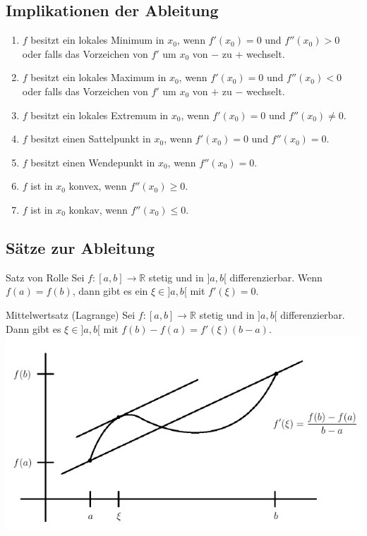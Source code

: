 \documentclass[a4paper,10pt]{article}
\def\R{\mathbb{R}}
\begin{document}
\subsection{Implikationen der Ableitung}
\begin{enumerate}
  \item $f$ besitzt ein lokales Minimum in $x_0$, wenn $f'(x_0) = 0$ und $f''(x_0) > 0$ oder falls das Vorzeichen von $f'$ um $x_0$ von $-$ zu $+$ wechselt.
  \item $f$ besitzt ein lokales Maximum in $x_0$, wenn $f'(x_0) = 0$ und $f''(x_0) < 0$ oder falls das Vorzeichen von $f'$ um $x_0$ von $+$ zu $-$ wechselt.
  \item $f$ besitzt ein lokales Extremum in $x_0$, wenn $f'(x_0) = 0$ und $f''(x_0) \ne 0$.
  \item $f$ besitzt einen Sattelpunkt in $x_0$, wenn $f'(x_0) = 0$ und $f''(x_0) = 0$.
  \item $f$ besitzt einen Wendepunkt in $x_0$, wenn $f''(x_0) = 0$.
  \item $f$ ist in $x_0$ konvex, wenn $f''(x_0) \ge 0$.
  \item $f$ ist in $x_0$ konkav, wenn $f''(x_0) \le 0$.
\end{enumerate}

\subsection{Sätze zur Ableitung}
\begin{subbox}{Satz von Rolle}
 Sei $f: [a,b] \to \R$ stetig und in $]a,b[$ differenzierbar. Wenn $f(a) = f(b)$, dann gibt es ein $\xi \in ]a,b[$ mit $f'(\xi) = 0$.
\end{subbox}
\begin{mainbox}{Mittelwertsatz (Lagrange)}
 Sei $f: [a,b] \to \R$ stetig und in $]a,b[$ differenzierbar. Dann gibt es $\xi \in ]a,b[$ mit $f(b) - f(a) = f'(\xi)(b-a)$.
 \includegraphics[width=\linewidth]{mittelwertsatz.png}
\end{mainbox}
\end{document}

